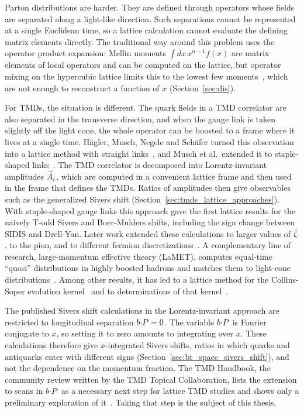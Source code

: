 Parton distributions are harder. They are defined through operators whose fields are separated along a light-like direction. Such separations cannot be represented at a single Euclidean time, so a lattice calculation cannot evaluate the defining matrix elements directly. The traditional way around this problem uses the operator product expansion: Mellin moments $\int dx\, x^{n-1} f(x)$ are matrix elements of local operators and can be computed on the lattice, but operator mixing on the hypercubic lattice limits this to the lowest few moments~\cite{Gockeler:1996mu}, which are not enough to reconstruct a function of $x$ (Section~\ref{sec:dis}).

For TMDs, the situation is different. The quark fields in a TMD correlator are also separated in the transverse direction, and when the gauge link is taken slightly off the light cone, the whole operator can be boosted to a frame where it lives at a single time. H\"agler, Musch, Negele and Sch\"afer turned this observation into a lattice method with straight links~\cite{Hagler:2009mb,Musch:2010ka}, and Musch et al.\ extended it to staple-shaped links~\cite{Musch:2011er}. The TMD correlator is decomposed into Lorentz-invariant amplitudes $\widetilde{A}_i$, which are computed in a convenient lattice frame and then used in the frame that defines the TMDs. Ratios of amplitudes then give observables such as the generalized Sivers shift (Section~\ref{sec:tmds_lattice_approaches}). With staple-shaped gauge links this approach gave the first lattice results for the naively T-odd Sivers and Boer-Mulders shifts, including the sign change between SIDIS and Drell-Yan. Later work extended these calculations to larger values of ${\hat \zeta}$, to the pion, and to different fermion discretizations~\cite{Engelhardt:2015xja,Yoon:2015ocs,Yoon:2017qzo}. A complementary line of research, large-momentum effective theory (LaMET), computes equal-time ``quasi'' distributions in highly boosted hadrons and matches them to light-cone distributions~\cite{Ji:2013dva,Ji:2014hxa,Ji:2020ect}. Among other results, it has led to a lattice method for the Collins-Soper evolution kernel~\cite{Ebert:2018gzl} and to determinations of that kernel~\cite{Shanahan:2021tst,Schlemmer:2021aij,LatticePartonLPC:2022eev}.

The published Sivers shift calculations in the Lorentz-invariant approach are restricted to longitudinal separation $b{\cdot} P = 0$. The variable $b{\cdot} P$ is Fourier conjugate to $x$, so setting it to zero amounts to integrating over $x$. These calculations therefore give $x$-integrated Sivers shifts, ratios in which quarks and antiquarks enter with different signs (Section~\ref{sec:bt_space_sivers_shift}), and not the dependence on the momentum fraction. The TMD Handbook, the community review written by the TMD Topical Collaboration, lists the extension to scans in $b{\cdot} P$ as a necessary next step for lattice TMD studies and shows only a preliminary exploration of it~\cite{Boussarie:2023izj}. Taking that step is the subject of this thesis.

